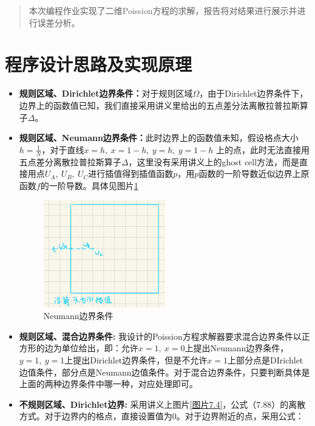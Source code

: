 \documentclass[UTF8]{ctexart}
\begin{document}
	
	\pagestyle{fancy}
	\fancyhead{}
	\rhead{\today}
	\begin{abstract}
		本次编程作业实现了二维Poission方程的求解，报告将对结果进行展示并进行误差分析。
	\end{abstract}
	\section{程序设计思路及实现原理}
	\begin{itemize}
		\item 	\textbf{规则区域、Dirichlet边界条件：}对于规则区域$\Omega$，由于Dirichlet边界条件下，边界上的函数值已知，我们直接采用讲义里给出的五点差分法离散拉普拉斯算子$\Delta$。
		\item  \textbf{规则区域、Neumann边界条件：}此时边界上的函数值未知，假设格点大小$h=\frac{1}{N}$，对于直线$x=h,\ x=1-h,\ y=h,\ y=1-h$ 上的点，此时无法直接用五点差分离散拉普拉斯算子$\Delta$，这里没有采用讲义上的ghost cell方法，而是直接用点$U_A,\ U_B,\ U_C$进行插值得到插值函数$p$，用$p$函数的一阶导数近似边界上原函数$f$的一阶导数。具体见图片\ref{图2}
		\begin{figure}[H]
			\centering
			\includegraphics[width=0.5\textwidth]{f2.jpg} %
			\caption{Neumann边界条件} %
			\label{图2} %
		\end{figure}
		\item \textbf{规则区域、混合边界条件:} 我设计的Poission方程求解器要求混合边界条件以正方形的边为单位给出，即：允许$x=1,\ x=0$上提出Neumann边界条件，$y=1,\ y=1$上提出Dirichlet边界条件，但是不允许$x=1$上部分点是DIrichlet边值条件，部分点是Neumann边值条件。对于混合边界条件，只要判断具体是上面的两种边界条件中哪一种，对应处理即可。
		\item  \textbf{不规则区域、Dirichlet边界:} 采用讲义上图片\ref{图片7.4}，公式（7.88）的离散方式。对于边界内的格点，直接设置值为0。对于边界附近的点，采用公式：

\end{itemize}
\end{document}
